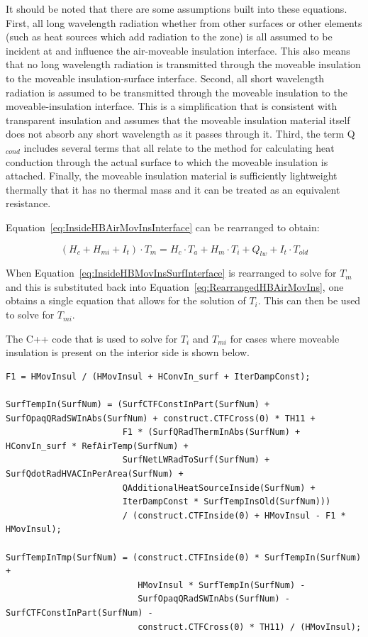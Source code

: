 It should be noted that there are some assumptions built into these equations.  First, all long wavelength radiation whether from other surfaces or other elements (such as heat sources which add radiation to the zone) is all assumed to be incident at and influence the air-moveable insulation interface.  This also means that no long wavelength radiation is transmitted through the moveable insulation to the moveable insulation-surface interface.  Second, all short wavelength radiation is assumed to be transmitted through the moveable insulation to the moveable-insulation interface.  This is a simplification that is consistent with transparent insulation and assumes that the moveable insulation material itself does not absorb any short wavelength as it passes through it.  Third, the term Q\(_{cond}\) includes several terms that all relate to the method for calculating heat conduction through the actual surface to which the moveable insulation is attached.  Finally, the moveable insulation material is sufficiently lightweight thermally that it has no thermal mass and it can be treated as an equivalent resistance.

Equation~\ref{eq:InsideHBAirMovInsInterface} can be rearranged to obtain:

\begin{equation}
\left( H_c + H_{mi} + I_t \right) \cdot T_m = H_c \cdot T_a + H_m \cdot T_i + Q_{lw} + I_t \cdot T_{old}
\label{eq:RearrangedHBAirMovIns}
\end{equation}

When Equation~\ref{eq:InsideHBMovInsSurfInterface} is rearranged to solve for \(T_m\) and this is substituted back into Equation~\ref{eq:RearrangedHBAirMovIns}, one obtains a single equation that allows for the solution of \(T_i\).  This can then be used to solve for \(T_{mi}\).

The C++ code that is used to solve for \(T_i\) and \(T_{mi}\) for cases where moveable insulation is present on the interior side is shown below.

\begin{lstlisting}
F1 = HMovInsul / (HMovInsul + HConvIn_surf + IterDampConst);

SurfTempIn(SurfNum) = (SurfCTFConstInPart(SurfNum) + SurfOpaqQRadSWInAbs(SurfNum) + construct.CTFCross(0) * TH11 +
                       F1 * (SurfQRadThermInAbs(SurfNum) + HConvIn_surf * RefAirTemp(SurfNum) +
                       SurfNetLWRadToSurf(SurfNum) + SurfQdotRadHVACInPerArea(SurfNum) +
                       QAdditionalHeatSourceInside(SurfNum) +
                       IterDampConst * SurfTempInsOld(SurfNum)))
                       / (construct.CTFInside(0) + HMovInsul - F1 * HMovInsul); 

SurfTempInTmp(SurfNum) = (construct.CTFInside(0) * SurfTempIn(SurfNum) +
                          HMovInsul * SurfTempIn(SurfNum) -
                          SurfOpaqQRadSWInAbs(SurfNum) - SurfCTFConstInPart(SurfNum) -
                          construct.CTFCross(0) * TH11) / (HMovInsul);
\end{lstlisting}


